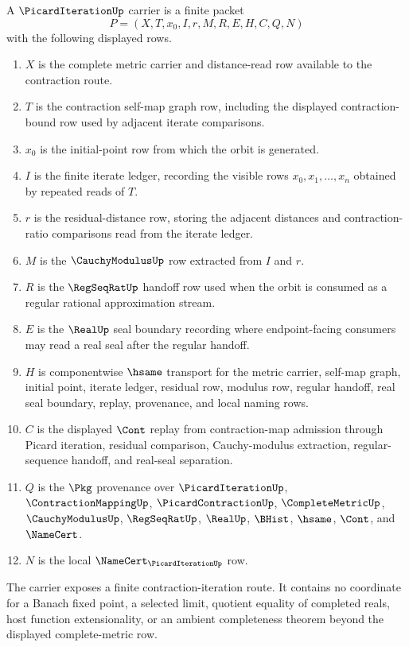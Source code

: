 \begin{definition}
\label{def:picard-iteration-carrier}
A $\PicardIterationUp$ carrier is a finite packet
$$
P=(X,T,x_0,I,r,M,R,E,H,C,Q,N)
$$
with the following displayed rows.
\begin{enumerate}
\item $X$ is the complete metric carrier and distance-read row available to the contraction route.
\item $T$ is the contraction self-map graph row, including the displayed contraction-bound row used by adjacent iterate comparisons.
\item $x_0$ is the initial-point row from which the orbit is generated.
\item $I$ is the finite iterate ledger, recording the visible rows $x_0,x_1,\ldots,x_n$ obtained by repeated reads of $T$.
\item $r$ is the residual-distance row, storing the adjacent distances and contraction-ratio comparisons read from the iterate ledger.
\item $M$ is the $\CauchyModulusUp$ row extracted from $I$ and $r$.
\item $R$ is the $\RegSeqRatUp$ handoff row used when the orbit is consumed as a regular rational approximation stream.
\item $E$ is the $\RealUp$ seal boundary recording where endpoint-facing consumers may read a real seal after the regular handoff.
\item $H$ is componentwise $\hsame$ transport for the metric carrier, self-map graph, initial point, iterate ledger, residual row, modulus row, regular handoff, real seal boundary, replay, provenance, and local naming rows.
\item $C$ is the displayed $\Cont$ replay from contraction-map admission through Picard iteration, residual comparison, Cauchy-modulus extraction, regular-sequence handoff, and real-seal separation.
\item $Q$ is the $\Pkg$ provenance over $\PicardIterationUp$, $\ContractionMappingUp$, $\PicardContractionUp$, $\CompleteMetricUp$, $\CauchyModulusUp$, $\RegSeqRatUp$, $\RealUp$, $\BHist$, $\hsame$, $\Cont$, and $\NameCert$.
\item $N$ is the local $\NameCert_{\PicardIterationUp}$ row.
\end{enumerate}
The carrier exposes a finite contraction-iteration route. It contains no coordinate for a Banach fixed point, a selected limit, quotient equality of completed reals, host function extensionality, or an ambient completeness theorem beyond the displayed complete-metric row.
\end{definition}

